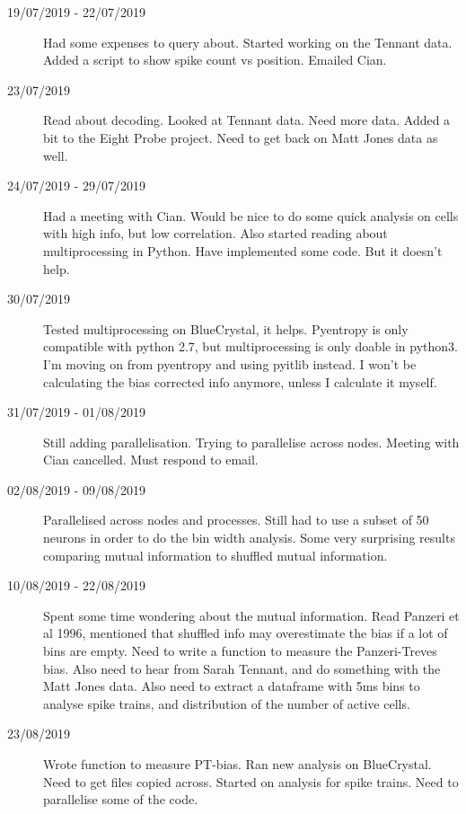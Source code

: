 \documentclass[a4paper,12pt]{article}
\theoremstyle{definition}
\begin{document}
\begin{description}
                                \item[19/07/2019 - 22/07/2019] Had some expenses to query about. Started working on the Tennant data. Added a script to show spike count vs position. Emailed Cian.

                                \item[23/07/2019] Read about decoding. Looked at Tennant data. Need more data. Added a bit to the Eight Probe project. Need to get back on Matt Jones data as well.

                                \item[24/07/2019 - 29/07/2019] Had a meeting with Cian. Would be nice to do some quick analysis on cells with high info, but low correlation. Also started reading about multiprocessing in Python. Have implemented some code. But it doesn't help.

                                \item[30/07/2019] Tested multiprocessing on BlueCrystal, it helps. Pyentropy is only compatible with python 2.7, but multiprocessing is only doable in python3. I'm moving on from pyentropy and using pyitlib instead. I won't be calculating the bias corrected info anymore, unless I calculate it myself.

                                \item[31/07/2019 - 01/08/2019] Still adding parallelisation. Trying to parallelise across nodes. Meeting with Cian cancelled. Must respond to email.

                                \item[02/08/2019 - 09/08/2019] Parallelised across nodes and processes. Still had to use a subset of 50 neurons in order to do the bin width analysis. Some very surprising results comparing mutual information to shuffled mutual information.

                                \item[10/08/2019 - 22/08/2019] Spent some time wondering about the mutual information. Read Panzeri et al 1996, mentioned that shuffled info may overestimate the bias if a lot of bins are empty. Need to write a function to measure the Panzeri-Treves bias. Also need to hear from Sarah Tennant, and do something with the Matt Jones data. Also need to extract a dataframe with 5ms bins to analyse spike trains, and distribution of the number of active cells. 

                                \item[23/08/2019] Wrote function to measure PT-bias. Ran new analysis on BlueCrystal. Need to get files copied across. Started on analysis for spike trains. Need to parallelise some of the code.


\end{description}
\end{document}

